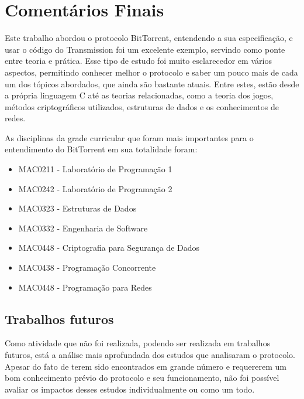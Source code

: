 
\chapter{Comentários Finais}

Este trabalho abordou o protocolo BitTorrent, entendendo a sua especificação, e usar o
código do Transmission foi um excelente exemplo, servindo como ponte entre teoria e
prática. Esse tipo de estudo foi muito esclarecedor em vários aspectos, permitindo
conhecer melhor o protocolo e saber um pouco mais de cada um dos tópicos abordados, que
ainda são bastante atuais. Entre estes, estão desde a própria linguagem C até as
teorias relacionadas, como a teoria dos jogos, métodos criptográficos utilizados,
estruturas de dados e os conhecimentos de redes.

As disciplinas da grade curricular que foram mais importantes para o entendimento do
BitTorrent em sua totalidade foram:

\begin{itemize}
    \item MAC0211 - Laboratório de Programação 1
    \item MAC0242 - Laboratório de Programação 2
    \item MAC0323 - Estruturas de Dados
    \item MAC0332 - Engenharia de Software
    \item MAC0448 - Criptografia para Segurança de Dados
    \item MAC0438 - Programação Concorrente
    \item MAC0448 - Programação para Redes
\end{itemize}

\section*{Trabalhos futuros}

Como atividade que não foi realizada, podendo ser realizada em trabalhos futuros, está a
análise mais aprofundada dos estudos que analisaram o protocolo. Apesar do fato de terem
sido encontrados em grande número e requererem um bom conhecimento prévio do protocolo e
seu funcionamento, não foi possível avaliar os impactos desses estudos individualmente
ou como um todo.

\afterpage{\clearpage}